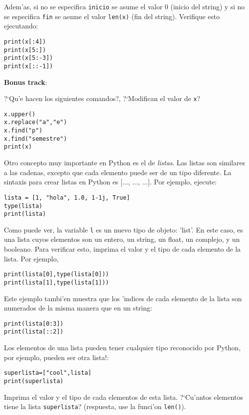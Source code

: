 \documentclass[11pt]{exam}
\begin{document}
\begin{questions}
\item Adem'as, si no se especifica \texttt{inicio} se asume el valor 0 (inicio del string) y si no se especifica \texttt{fin} se asume el valor \texttt{len(x)} (fin del string). Verifique esto ejecutando:
\begin{verbatim}
print(x[:4])
print(x[5:])
print(x[5:-3])
print(x[::-1])
\end{verbatim}
\item \textbf{Bonus track}: 

?`Qu'e hacen los siguientes comandos?, ?`Modifican el valor de \texttt{x}?
\begin{verbatim}
x.upper()
x.replace("a","e")
x.find("p")
x.find("semestre")
print(x)
\end{verbatim}
\item Otro concepto muy importante en Python es el de \textit{listas}. Las listas son  similares a las cadenas, excepto que cada elemento puede ser de un tipo diferente. La sintaxis para crear listas en Python es [..., ..., ...]. Por ejemplo, ejecute:
\begin{verbatim}
lista = [1, "hola", 1.0, 1-1j, True]
type(lista)
print(lista)
\end{verbatim}
Como puede ver, la variable \texttt{l} es un nuevo tipo de objeto: 'list'. En este caso, es una lista cuyos elementos son un entero, un string, un float, un complejo, y un booleano. Para verificar esto, imprima el valor y el tipo de cada elemento de la lista. Por ejemplo,
\begin{verbatim}
print(lista[0],type(lista[0]))
print(lista[1],type(lista[1]))
\end{verbatim}
Este ejemplo tambi'en muestra que los 'indices de cada elemento de la lista son numerados de la misma manera que en un string:
\begin{verbatim}
print(lista[0:3])
print(lista[::2])
\end{verbatim}
\item Los elementos de una lista pueden tener cualquier tipo reconocido por Python, por ejemplo, pueden ser otra lista!:
\begin{verbatim}
superlista=["cool",lista]
print(superlista)
\end{verbatim}
Imprima el valor y el tipo de cada elementos de esta lista. ?`Cu'antos elementos tiene la lista \texttt{superlista}? (respuesta, use la funci'on \texttt{len()}).


\end{questions}
\end{document}
